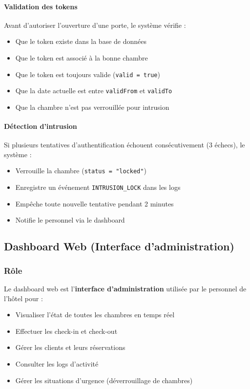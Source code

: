 \documentclass[11pt,a4paper]{article}
\begin{document}
\paragraph{Validation des tokens}
Avant d'autoriser l'ouverture d'une porte, le système vérifie :
\begin{itemize}
    \item Que le token existe dans la base de données
    \item Que le token est associé à la bonne chambre
    \item Que le token est toujours valide (\texttt{valid = true})
    \item Que la date actuelle est entre \texttt{validFrom} et \texttt{validTo}
    \item Que la chambre n'est pas verrouillée pour intrusion
\end{itemize}

\paragraph{Détection d'intrusion}
Si plusieurs tentatives d'authentification échouent consécutivement (3 échecs), le système :
\begin{itemize}
    \item Verrouille la chambre (\texttt{status = "locked"})
    \item Enregistre un événement \texttt{INTRUSION\_LOCK} dans les logs
    \item Empêche toute nouvelle tentative pendant 2 minutes
    \item Notifie le personnel via le dashboard
\end{itemize}

\subsection{Dashboard Web (Interface d'administration)}

\subsubsection{Rôle}

Le dashboard web est l'\textbf{interface d'administration} utilisée par le personnel de l'hôtel pour :
\begin{itemize}
    \item Visualiser l'état de toutes les chambres en temps réel
    \item Effectuer les check-in et check-out
    \item Gérer les clients et leurs réservations
    \item Consulter les logs d'activité
    \item Gérer les situations d'urgence (déverrouillage de chambres)
\end{itemize}
\end{document}
